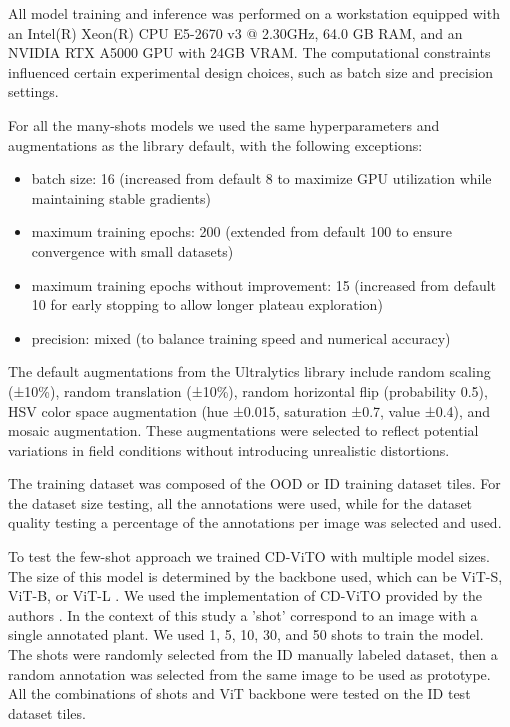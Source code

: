 \documentclass[12pt,a4paper,oneside]{report}
\begin{document}
All model training and inference was performed on a workstation equipped with an Intel(R) Xeon(R) 
CPU E5-2670 v3 @ 2.30GHz, 64.0 GB RAM, and an NVIDIA RTX A5000 GPU with 24GB VRAM. 
The computational constraints influenced certain experimental design choices, such as 
batch size and precision settings.

For all the many-shots models we used the same hyperparameters and augmentations as the
library default, with the following exceptions:

\begin{itemize}
  \item batch size: 16 (increased from default 8 to maximize GPU utilization while maintaining stable gradients)
  \item maximum training epochs: 200 (extended from default 100 to ensure convergence with small datasets)
  \item maximum training epochs without improvement: 15 (increased from default 10 for early stopping to allow longer plateau exploration)
  \item precision: mixed (to balance training speed and numerical accuracy)
\end{itemize}

The default augmentations from the Ultralytics library include random scaling (±10\%), 
random translation (±10\%), random horizontal flip (probability 0.5), 
HSV color space augmentation (hue ±0.015, saturation ±0.7, value ±0.4), 
and mosaic augmentation. These augmentations were selected to reflect potential 
variations in field conditions without introducing unrealistic distortions.

The training dataset was composed of the OOD or ID training dataset tiles.
For the dataset size testing, all the annotations were used, while for the dataset quality testing
a percentage of the annotations per image was selected and used.

To test the few-shot approach we trained CD-ViTO with multiple model sizes.
The size of this model is determined by the backbone used, which can be ViT-S, ViT-B, or ViT-L \cite{oquabDINOv2LearningRobust2024}. 
We used the implementation of CD-ViTO provided by the authors \cite{fuCrossDomainFewShotObject2024}.
In the context of this study a 'shot' correspond to an image with a single annotated plant. 
We used 1, 5, 10, 30, and 50 shots to train the model.
The shots were randomly selected from the ID manually labeled dataset, then a 
random annotation was selected from the same image to be used as prototype.
All the combinations of shots and ViT backbone were tested on the ID test dataset tiles.
\end{document}
